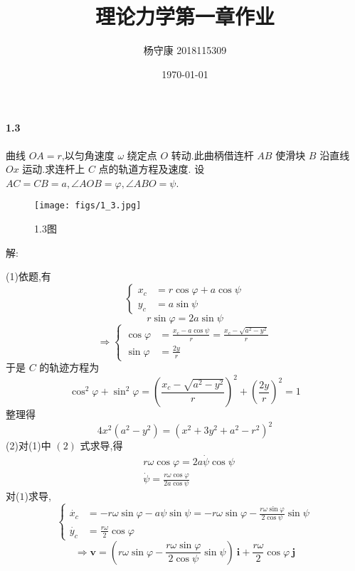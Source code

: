 \documentclass[UTF8,a4paper]{ctexart}
\title{理论力学第一章作业}
\date{\today}
\author{杨守康 2018115309}
\begin{document}
	\maketitle
	
\paragraph{1.3} 曲线 $ OA = r $,以匀角速度 $ \omega $ 绕定点 $ O $ 转动.此曲柄借连杆 $ AB $ 使滑块 $ B $ 沿直线 $ Ox $ 运动.求连杆上 $ C $ 点的轨道方程及速度. 设 $ AC = CB = a, \angle AOB = \varphi , \angle ABO = \psi $.
	\begin{figure}[h]
		\centering
		\texttt{[image: figs/1\_3.jpg]}
		\caption{1.3图}
	\end{figure}
\par 解:

(1)依题,有
\begin{equation}
	\left\{
	\begin{aligned}
	x_c &= r \cos \varphi + a \cos \psi \\
	y_c &= a \sin \psi
	\end{aligned}
	\right.	 
\end{equation}
\begin{equation}
	r \sin \varphi = 2 a \sin \psi
\end{equation}	
\begin{equation*}
	\Rightarrow 
	\left\{
	\begin{aligned}
	\cos \varphi &= \frac{x_c - a \cos \psi }{r} = \frac{x_c -\sqrt{a^2 - y^2}}{r}\\
	\sin \varphi &= \frac{2 y}{r}
	\end{aligned}
	\right.
\end{equation*}
于是 $ C $ 的轨迹方程为
\begin{equation*}
	\cos ^2 \varphi + \sin ^2 \varphi =
	\left( \frac{x_c -\sqrt{a^2 - y^2}}{r}\right) ^2 + \left(  \frac{2 y}{r} \right)^2 = 1
\end{equation*}
整理得
\begin{equation*}
	4x^2 \left( a^2 - y^2 \right) =
	\left( x^2 + 3y^2 + a^2 - r^2 \right) ^2
\end{equation*}
(2)对(1)中 $(2)$ 式求导,得
\begin{equation*}
	\begin{aligned}
	&r \omega \cos \varphi = 2a \dot{\psi} \cos \psi \\
	&\dot{\psi} = \frac{r \omega \cos \varphi}{2a \cos \psi}
	\end{aligned}
\end{equation*}
对($1$)求导,
\begin{equation}
	\left\{
	\begin{aligned}
	\dot{x_c} &= -r \omega \sin \varphi -a \psi \sin \psi 
	=-r \omega \sin \varphi - \frac{r \omega \sin \varphi}{2 \cos \psi} \sin \psi\\
	\dot{y_c} &= \frac{r \omega}{2} \cos \varphi
	\end{aligned}
	\right.
\end{equation}
\[\Rightarrow \boldsymbol{v} = \left( r \omega \sin \varphi - \frac{r \omega \sin \varphi}{2 \cos \psi} \sin \psi \right) \  \boldsymbol{i} + \frac{r \omega}{2} \cos \varphi \  \boldsymbol{j} \]
\end{document}
